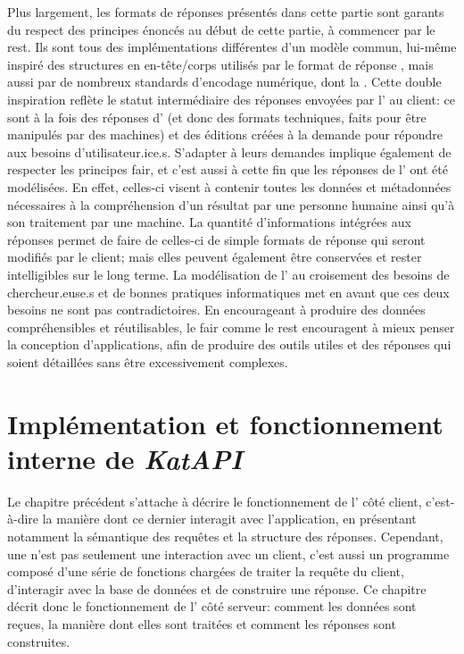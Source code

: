 Plus largement, les formats de réponses présentés dans cette partie sont garants du respect des principes énoncés au début de cette partie, à commencer par le \gls{rest}. Ils sont tous des implémentations différentes d'un modèle commun, lui-même inspiré des structures en en-tête/corps utilisés par le format de réponse \sparql{}, mais aussi par de nombreux standards d'encodage numérique, dont la \tei{}. Cette double inspiration reflète le statut intermédiaire des réponses envoyées par l'\api{} au client: ce sont à la fois des réponses d'\api{} (et donc des formats techniques, faits pour être manipulés par des machines) et des éditions créées à la demande pour répondre aux besoins d'utilisateur.ice.s. S'adapter à leurs demandes implique également de respecter les principes \gls{fair}, et c'est aussi à cette fin que les réponses de l'\api{} ont été modélisées. En effet, celles-ci visent à contenir toutes les données et métadonnées nécessaires à la compréhension d'un résultat par une personne humaine ainsi qu'à son traitement par une machine. La quantité d'informations intégrées aux réponses permet de faire de celles-ci de simple formats de réponse qui seront modifiés par le client; mais elles peuvent également être conservées et rester intelligibles sur le long terme. La modélisation de l'\api{} au croisement des besoins de chercheur.euse.s et de bonnes pratiques informatiques met en avant que ces deux besoins ne sont pas contradictoires. En encourageant à produire des données compréhensibles et réutilisables, le \gls{fair} comme le \gls{rest} encouragent à mieux penser la conception d'applications, afin de produire des outils utiles et des réponses qui soient détaillées sans être excessivement complexes.

\chapter{Implémentation et fonctionnement interne de \textit{KatAPI}}
Le chapitre précédent s'attache à décrire le fonctionnement de l'\api{} côté client, c'est-à-dire la manière dont ce dernier interagit avec l'application, en présentant notamment la sémantique des requêtes et la structure des réponses. Cependant, une \api{} n'est pas seulement une interaction avec un client, c'est aussi un programme composé d'une série de fonctions chargées de traiter la requête du client, d'interagir avec la base de données et de construire une réponse. Ce chapitre décrit donc le fonctionnement de l'\api{} côté serveur: comment les données sont reçues, la manière dont elles sont traitées et comment les réponses sont construites.

